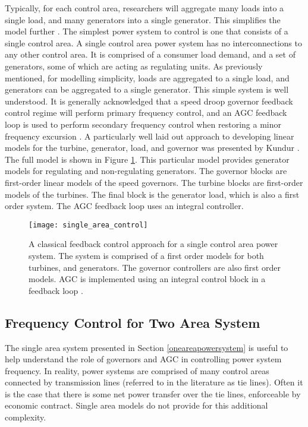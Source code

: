 Typically, for each control area, researchers will aggregate many loads into a single load, and many generators into a single generator. This simplifies the model further \cite{Grainger1994}. The simplest power system to control is one that consists of a single control area. A single control area power system has no interconnections to any other control area. It is comprised of a consumer load demand, and a set of generators, some of which are acting as regulating units. As previously mentioned, for modelling simplicity, loads are aggregated to a single load, and generators can be aggregated to a single generator. This simple system is well understood. It is generally acknowledged that a speed droop governor feedback control regime will perform primary frequency control, and an AGC feedback loop is used to perform secondary frequency control when restoring a minor frequency excursion \cite{Wood2013, Grainger1994, Kothari2011, Kundur1994}. A particularly well laid out approach to developing linear models for the turbine, generator, load, and governor was presented by Kundur \cite{Kundur1994}. The full model is shown in Figure \ref{fig:singleareacontrol}. This particular model provides generator models for regulating and non-regulating generators. The governor blocks are first-order linear models of the speed governors. The turbine blocks are first-order models of the turbines. The final block is the generator load, which is also a first order system. The AGC feedback loop uses an integral controller.

\begin{figure}[ht]
\centering
\texttt{[image: single\_area\_control]}
\caption{A classical feedback control approach for a single control area power system. The system is comprised of a first order models for both turbines, and generators. The governor controllers are also first order models. AGC is implemented using an integral control block in a feedback loop \cite{Kundur1994}.}
\label{fig:singleareacontrol}
\end{figure}

\newpage


\subsection{Frequency Control for Two Area System}
The single area system presented in Section \ref{oneareapowersystem} is useful to help understand the role of governors and AGC in controlling power system frequency. In reality, power systems are comprised of many control areas connected by transmission lines (referred to in the literature as tie lines). Often it is the case that there is some net power transfer over the tie lines, enforceable by economic contract. Single area models do not provide for this additional complexity.

